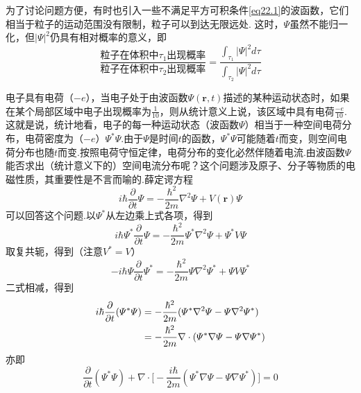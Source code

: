 为了讨论问题方便，有时也引入一些不满足平方可积条件\eqref{eq22.1}的波函数，它们相当于粒子的运动范围没有限制，粒子可以到达无限远处. 这时，$\varPsi$虽然不能归一化，但$|\varPsi|^{2}$仍具有相对概率的意义，即
\begin{equation}\label{eq22.4}
	\frac{\text{粒子在体积中}\tau_{1}\text{出现概率}}{\text{粒子在体积中}\tau_{2}\text{出现概率}}
	=\frac{\int_{\tau_{1}}|\varPsi|^{2}d\tau}{\int_{\tau_{2}}|\varPsi|^{2}d\tau}
\end{equation}\eqlong

电子具有电荷（$-e$），当电子处于由波函数$\varPsi(\boldsymbol{r},t)$描述的某种运动状态时，如果在某个局部区域中电子出现概率为$\frac{1}{10}$，则从统计意义上说，该区域中具有电荷$\frac{-e}{10}$.这就是说，统计地看，电子的每一种运动状态（波函数$\varPsi$）相当于一种空间电荷分布，电荷密度为（$-e$）$\varPsi^{*}\varPsi$.由于$\varPsi$是时间$t$的函数，$\varPsi^{*}\varPsi$可能随着$t$而变，则空间电荷分布也随$t$而变.按照电荷守恒定律，电荷分布的变化必然伴随着电流.由波函数$\varPsi$能否求出（统计意义下的）空间电流分布呢？这个问题涉及原子、分子等物质的电磁性质，其重要性是不言而喻的.薛定谔方程
\begin{equation}\label{eq22.5}
	i\hbar\frac{\partial}{\partial t}\varPsi
	=-\frac{\hbar^{2}}{2m}\nabla^{2}\varPsi+V(\boldsymbol{r})\varPsi
\end{equation}
可以回答这个问题.以$\varPsi^{*}$从左边乘上式各项，得到
\begin{equation*}
	i\hbar\varPsi^{*}\frac{\partial}{\partial t}\varPsi
	=-\frac{\hbar^{2}}{2m}\varPsi^{*}\nabla^{2}\varPsi+\varPsi^{*}V\varPsi
\end{equation*}
取复共轭，得到（注意$V^{*}=V$）
\begin{equation*}
	-i\hbar\varPsi\frac{\partial}{\partial t}\varPsi^{*}
	=-\frac{\hbar^{2}}{2m}\varPsi\nabla^{2}\varPsi^{*}+\varPsi V\varPsi^{*}
\end{equation*}
二式相减，得到
\begin{equation}
	\begin{aligned} \notag
		i\hbar\frac{\partial}{\partial t}(\varPsi^{*}\varPsi)
		&=-\frac{\hbar^{2}}{2m}(\varPsi^{*}\nabla^{2}\varPsi-\varPsi\nabla^{2}\varPsi^{*}) \\
		&=-\frac{\hbar^{2}}{2m}\nabla\cdot(\varPsi^{*}\nabla\varPsi-\varPsi\nabla\varPsi^{*})
	\end{aligned}
\end{equation}
亦即
\begin{equation}\label{eq22.6}
	\frac{\partial}{\partial t}(\varPsi^{*}\varPsi)+\nabla\cdot
	\big[-\frac{i\hbar}{2m} (\varPsi^{*}\nabla\varPsi-\varPsi\nabla\varPsi^{*}) \big]=0
\end{equation}\eqshort
